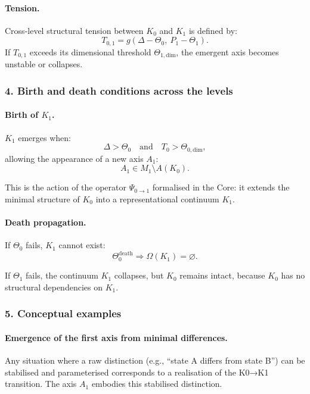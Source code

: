 \paragraph{Tension.}
Cross-level structural tension between $K_0$ and $K_1$ is defined by:
\[
T_{0,1} = g(\Delta - \Theta_0,\ P_1 - \Theta_1).
\]
If $T_{0,1}$ exceeds its dimensional threshold $\Theta_{1,\mathrm{dim}}$,
the emergent axis becomes unstable or collapses.

\subsubsection{4. Birth and death conditions across the levels}

\paragraph{Birth of \texorpdfstring{$K_1$}{K_1}.}
$K_1$ emerges when:
\[
\Delta > \Theta_0
\quad \text{and} \quad
T_0 > \Theta_{0,\mathrm{dim}},
\]
allowing the appearance of a new axis $A_1$:
\[
A_1 \in M_1 \setminus A(K_0).
\]

This is the action of the operator $\Psi_{0\rightarrow 1}$ formalised in the
Core: it extends the minimal structure of $K_0$ into a representational
continuum $K_1$.

\paragraph{Death propagation.}
If $\Theta_0$ fails, $K_1$ cannot exist:
\[
\Theta_0^{\mathrm{death}} 
\Rightarrow \Omega(K_1)=\varnothing.
\]

If $\Theta_1$ fails, the continuum $K_1$ collapses, but $K_0$ remains intact,
because $K_0$ has no structural dependencies on $K_1$.

\subsubsection{5. Conceptual examples}

\paragraph{Emergence of the first axis from minimal differences.}
Any situation where a raw distinction (e.g., ``state A differs from state B'')
can be stabilised and parameterised corresponds to a realisation of the
K0→K1 transition. The axis $A_1$ embodies this stabilised distinction.

